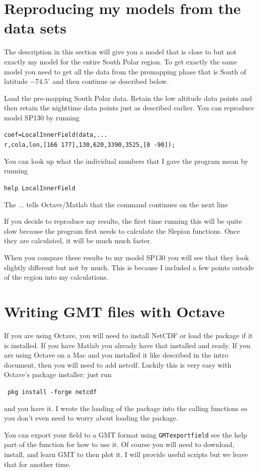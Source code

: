 \documentclass[11pt]{article}
\begin{document}
 







\section{Reproducing my models from the data sets}\label{repro}
The description in this section will give you a model that is close to but not exactly my model for the entire South Polar region. To get exactly the same model you need to get all the data from the premapping phase that is South of latitude $-74.5^\circ$ and then continue as described below.

Load the pre-mapping South Polar data. Retain the low altitude data points and then retain the nighttime data points just as described earlier. You can reproduce model SP130 by running

\qquad \verb+coef=LocalInnerField(data,...+\\
\verb+r,cola,lon,[166 177],130,620,3390,3525,[0 -90]);+

You can look up what the individual numbers that I gave the program mean by running

\qquad \verb+help LocalInnerField+

The ... tells Octave/Matlab that the command continues on the next line

If you decide to reproduce my results, the first time running this will be quite slow because the program first needs to calculate the Slepian functions. Once they are calculated, it will be much much faster.

When you compare these results to my model SP130 you will see that they look slightly different but not by much. This is because I included a few points outside of the region into my calculations.


\section{Writing GMT files with Octave}\label{OctaveGMT}

If you are using Octave, you will need to install NetCDF or load the package if it is installed. If you have Matlab you already have that installed and ready. If you are using Octave on a Mac and you installed it like described in the intro document, then you will need to add netcdf. 
Luckily this is very easy with Octave's package installer: just run

\qquad\verb+ pkg install -forge netcdf+

and you have it. I wrote the loading of the package into the calling functions so you don't even need to worry about loading the package.

You can export your field to a GMT format using \verb+GMTexportfield+ see the help part of the function for how to use it. Of course you will need to download, install, and learn GMT to then plot it. I will provide useful scripts but we leave that for another time.
\end{document}
